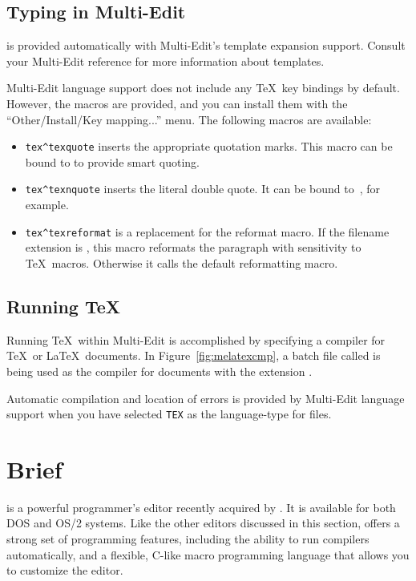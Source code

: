 \subsection{Typing in Multi-Edit}

  is 
provided automatically with Multi-Edit's
template expansion support.  Consult your Multi-Edit reference for
more information about templates.

Multi-Edit language support does not include any \TeX\ key bindings by
default.  However, the macros are provided, and you can install them with
the ``Other/Install/Key mapping...'' menu.
The following macros are available:

\begin{itemize}
  \item \verb|tex^texquote| inserts the appropriate quotation marks.
        This macro can be bound to  to provide smart 
        quoting.
  \item \verb|tex^texnquote| inserts the literal double quote.
        It can be bound to \,, for example.
  \item \verb|tex^texreformat| is a replacement for the reformat macro.
        If the filename extension is , this macro reformats
        the paragraph with sensitivity to \TeX\ macros.  Otherwise it calls
        the default reformatting macro.
\end{itemize}

\subsection{Running \TeX}

Running \TeX\ within Multi-Edit is accomplished by specifying a compiler for
\TeX\ or \LaTeX\ documents.  In Figure~\ref{fig:melatexcmp}, a batch file called
 is being used as the compiler for documents with the
extension .

Automatic compilation and location of errors is provided by Multi-Edit
language support when you have selected \verb|TEX| as the language-type
for  files.

\section{Brief}

 is 
a powerful programmer's editor recently acquired by
.  It is available for both DOS and OS/2 systems.
Like the other editors discussed in this section,  offers
a strong set of programming features, including the ability to run 
compilers automatically, and a flexible, C-like macro programming language
that allows you to customize the editor.

